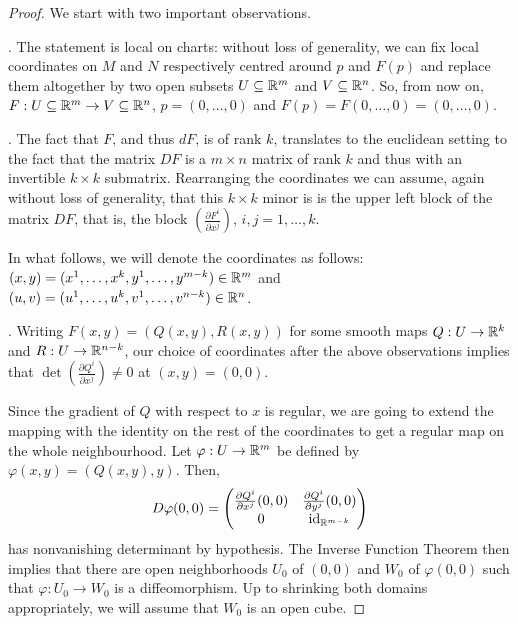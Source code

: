 \begin{proof}
  We start with two important observations.
  
  . The statement is local on charts: without loss of generality,
  we can fix local coordinates on $M$ and $N$ respectively centred around $p$ and $F(p)$
  and replace them altogether by two open subsets $U\subseteq \mathbb{R}^m$ and $V \subseteq \mathbb{R}^n$.
  So, from now on, $F: U \subseteq \mathbb{R}^m \to V \subseteq \mathbb{R}^n$, $p=(0,\ldots,0)$
  and $F(p) = F(0,\ldots,0) = (0,\ldots,0)$.

  . The fact that $F$, and thus $dF$, is of rank $k$, translates to
  the euclidean setting to the fact that the matrix $DF$ is a $m\times n$ matrix of rank $k$
  and thus with an invertible $k\times k$ submatrix.
  Rearranging the coordinates we can assume, again without loss of generality, that this
  $k\times k$ minor is is the upper left block of the matrix $DF$, that is, the block
  $\left( \frac{\partial F^i}{\partial x^j} \right)$, $i,j = 1,\ldots, k$.

  In what follows, we will denote the coordinates as follows:
  $(x,y) = (x^1, \ldots, x^k, y^1, \ldots, y^{m-k})\in\mathbb{R}^m$
  and $(u,v) = (u^1, \ldots, u^k, v^1, \ldots, v^{n-k})\in\mathbb{R}^n$.
  \medskip

  .
  Writing $F(x,y) = (Q(x,y), R(x,y))$ for some smooth maps $Q: U \to \mathbb{R}^k$ and $R: U \to \mathbb{R}^{n-k}$,
  our choice of coordinates after the above observations implies that
  $\det \left( \frac{\partial Q^i}{\partial x^j} \right) \neq 0$ at $(x,y) = (0,0)$.

  Since the gradient of $Q$ with respect to $x$ is regular, we are going to extend
  the mapping with the identity on the rest of the coordinates to get a regular map
  on the whole neighbourhood.
  Let $\varphi : U \to \mathbb{R}^m$ be defined by $\varphi(x,y) = (Q(x,y), y)$. Then,
  \begin{equation}
    D\varphi(0,0) = 
    \begin{pmatrix}
      \frac{\partial Q^i}{\partial x^j}(0,0) & \frac{\partial Q^i}{\partial y^j}(0,0) \\
      0 & \operatorname{id}_{\mathbb{R}^{m-k}}
    \end{pmatrix}
  \end{equation}
  has nonvanishing determinant by hypothesis.
  The Inverse Function Theorem then implies that there are open neighborhoods $U_0$ of $(0,0)$
  and $W_0$ of $\varphi(0,0)$ such that $\varphi : U_0 \to W_0$ is a diffeomorphism.
  Up to shrinking both domains appropriately, we will assume that $W_0$ is an open cube.


\end{proof}

